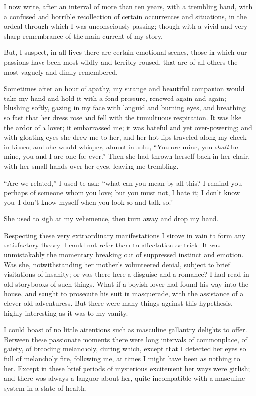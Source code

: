 \documentclass[11pt,twoside,makeidx,hidelinks,]{memoir}
\begin{document}
I now write, after an interval of more than ten years, with a trembling
hand, with a confused and horrible recollection of certain occurrences
and situations, in the ordeal through which I was unconsciously passing;
though with a vivid and very sharp remembrance of the main current of
my story.

But, I suspect, in all lives there are certain emotional scenes, those
in which our passions have been most wildly and terribly roused, that
are of all others the most vaguely and dimly remembered.

Sometimes after an hour of apathy, my strange and beautiful companion
would take my hand and hold it with a fond pressure, renewed again and
again; blushing softly, gazing in my face with languid and burning eyes,
and breathing so fast that her dress rose and fell with the tumultuous
respiration. It was like the ardor of a lover; it embarrassed me; it was
hateful and yet over-powering; and with gloating eyes she drew me to
her, and her hot lips traveled along my cheek in kisses; and she would
whisper, almost in sobs, ``You are mine, you \emph{shall} be mine, you and I
are one for ever.'' Then she had thrown herself back in her chair, with
her small hands over her eyes, leaving me trembling.

``Are we related,'' I used to ask; ``what can you mean by all this? I
remind you perhaps of someone whom you love; but you must not, I hate
it; I don't know you--I don't know myself when you look so and talk so.''

She used to sigh at my vehemence, then turn away and drop my hand.

Respecting these very extraordinary manifestations I strove in vain to
form any satisfactory theory--I could not refer them to affectation or
trick. It was unmistakably the momentary breaking out of suppressed
instinct and emotion. Was she, notwithstanding her mother's volunteered
denial, subject to brief visitations of insanity; or was there here a
disguise and a romance? I had read in old storybooks of such things.
What if a boyish lover had found his way into the house, and sought to
prosecute his suit in masquerade, with the assistance of a clever old
adventuress. But there were many things against this hypothesis, highly
interesting as it was to my vanity.

I could boast of no little attentions such as masculine gallantry
delights to offer. Between these passionate moments there were long
intervals of commonplace, of gaiety, of brooding melancholy, during
which, except that I detected her eyes so full of melancholy fire,
following me, at times I might have been as nothing to her. Except in
these brief periods of mysterious excitement her ways were girlish; and
there was always a languor about her, quite incompatible with a
masculine system in a state of health.
\end{document}
